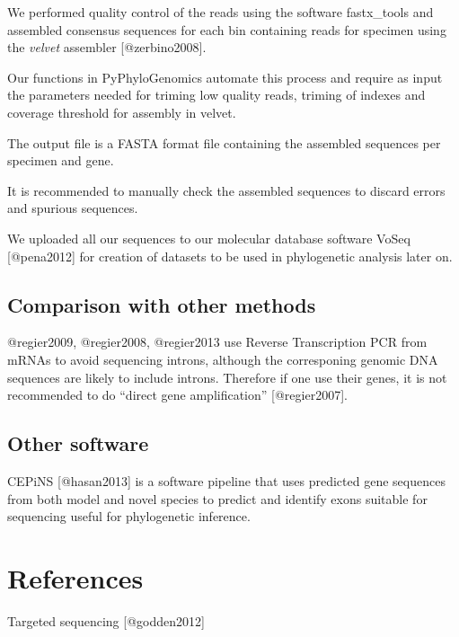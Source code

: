\documentclass[]{article}
\begin{document}
We performed quality control of the reads using the software
fastx\_tools and assembled consensus sequences for each bin containing
reads for specimen using the \emph{velvet} assembler {[}@zerbino2008{]}.

Our functions in PyPhyloGenomics automate this process and require as
input the parameters needed for triming low quality reads, triming of
indexes and coverage threshold for assembly in velvet.

The output file is a FASTA format file containing the assembled
sequences per specimen and gene.

It is recommended to manually check the assembled sequences to discard
errors and spurious sequences.

We uploaded all our sequences to our molecular database software VoSeq
{[}@pena2012{]} for creation of datasets to be used in phylogenetic
analysis later on.

\subsection{Comparison with other methods}

@regier2009, @regier2008, @regier2013 use Reverse Transcription PCR from
mRNAs to avoid sequencing introns, although the corresponing genomic DNA
sequences are likely to include introns. Therefore if one use their
genes, it is not recommended to do ``direct gene amplification''
{[}@regier2007{]}.

\subsection{Other software}

CEPiNS {[}@hasan2013{]} is a software pipeline that uses predicted gene
sequences from both model and novel species to predict and identify
exons suitable for sequencing useful for phylogenetic inference.

\section{References}

Targeted sequencing {[}@godden2012{]}
\end{document}
